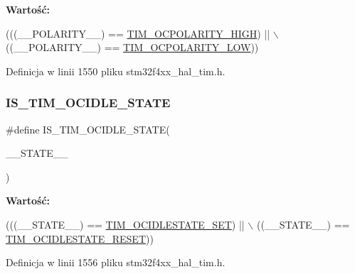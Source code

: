 {\bfseries Wartość\+:}
\begin{DoxyCode}
(((\_\_POLARITY\_\_) == \hyperlink{group___t_i_m___output___compare___polarity_ga5887380660b742f0045e9695914231b8}{TIM\_OCPOLARITY\_HIGH}) || \(\backslash\)
                                            ((\_\_POLARITY\_\_) == 
      \hyperlink{group___t_i_m___output___compare___polarity_ga1daff1574b0a2d17ccc9ae40a649ac37}{TIM\_OCPOLARITY\_LOW}))
\end{DoxyCode}


Definicja w linii 1550 pliku stm32f4xx\+\_\+hal\+\_\+tim.\+h.

\mbox{\label{group___t_i_m___private___macros_ga7c2f6448bbecfc404a3644cc5c978789}} 
\subsubsection{\texorpdfstring{I\+S\+\_\+\+T\+I\+M\+\_\+\+O\+C\+I\+D\+L\+E\+\_\+\+S\+T\+A\+TE}{IS\_TIM\_OCIDLE\_STATE}}
{\footnotesize\ttfamily \#define I\+S\+\_\+\+T\+I\+M\+\_\+\+O\+C\+I\+D\+L\+E\+\_\+\+S\+T\+A\+TE(\begin{DoxyParamCaption}\item[{}]{\+\_\+\+\_\+\+S\+T\+A\+T\+E\+\_\+\+\_\+ }\end{DoxyParamCaption})}

{\bfseries Wartość\+:}
\begin{DoxyCode}
(((\_\_STATE\_\_) == \hyperlink{group___t_i_m___output___compare___idle___state_gad251b83b0e33ddd0ed2fb35aa747ef78}{TIM\_OCIDLESTATE\_SET}) || \(\backslash\)
                                            ((\_\_STATE\_\_) == 
      \hyperlink{group___t_i_m___output___compare___idle___state_ga56505fe4142096454f1da97683ce8bc2}{TIM\_OCIDLESTATE\_RESET}))
\end{DoxyCode}


Definicja w linii 1556 pliku stm32f4xx\+\_\+hal\+\_\+tim.\+h.

\mbox{\label{group___t_i_m___private___macros_gab196fb0e0bafa567b6888e72f0496a55}} 
